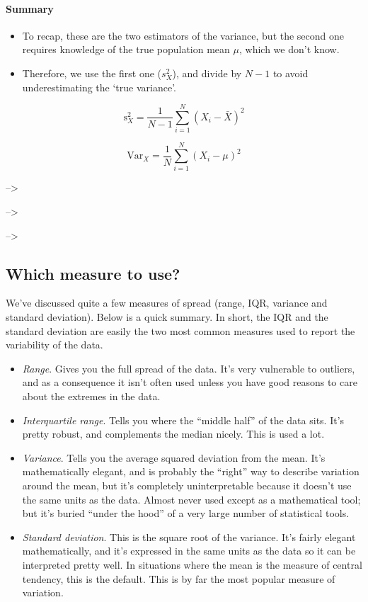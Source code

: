 \documentclass[
]{book}
\providecommand{\tightlist}{%
  \setlength{\itemsep}{0pt}\setlength{\parskip}{0pt}}
\begin{document}
\hypertarget{summary-1}{%
\paragraph{Summary}\label{summary-1}}

\begin{itemize}
\tightlist
\item
  To recap, these are the two estimators of the variance, but the second one requires knowledge of the true population mean \(\mu\), which we don't know.
\item
  Therefore, we use the first one (\(s_X^2\)), and divide by \(N-1\) to avoid underestimating the `true variance'.
\end{itemize}

\[
\mbox{s}_X^2 = \frac{1}{N-1} \sum_{i=1}^N \left( X_i - \bar{X} \right)^2
\]

\[
\mbox{Var}_X = \frac{1}{N} \sum_{i=1}^N \left( X_i - \mu \right)^2
\]

--\textgreater{}

--\textgreater{}

--\textgreater{}

\hypertarget{which-measure-to-use}{%
\subsection{Which measure to use?}\label{which-measure-to-use}}

We've discussed quite a few measures of spread (range, IQR, variance and standard deviation). Below is a quick summary.
In short, the IQR and the standard deviation are easily the two most common measures used to report the variability of the data.

\begin{itemize}
\tightlist
\item
  \emph{Range}. Gives you the full spread of the data. It's very vulnerable to outliers, and as a consequence it isn't often used unless you have good reasons to care about the extremes in the data.
\item
  \emph{Interquartile range}. Tells you where the ``middle half'' of the data sits. It's pretty robust, and complements the median nicely. This is used a lot.
\item
  \emph{Variance}. Tells you the average squared deviation from the mean. It's mathematically elegant, and is probably the ``right'' way to describe variation around the mean, but it's completely uninterpretable because it doesn't use the same units as the data. Almost never used except as a mathematical tool; but it's buried ``under the hood'' of a very large number of statistical tools.
\item
  \emph{Standard deviation}. This is the square root of the variance. It's fairly elegant mathematically, and it's expressed in the same units as the data so it can be interpreted pretty well. In situations where the mean is the measure of central tendency, this is the default. This is by far the most popular measure of variation.
\end{itemize}
\end{document}
